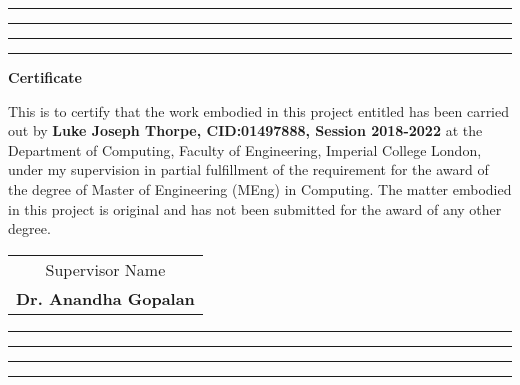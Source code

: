 \thispagestyle{empty}
\hrule\hrule\hrule\hrule %
\vspace{1 in}

\begin{center}

    \textbf{\large Certificate}
    \\
\end{center}
This is to certify that the work embodied in this project entitled \textbf{} has been carried out by \textbf{Luke Joseph Thorpe, CID:01497888, Session 2018-2022} at the Department of Computing, Faculty of Engineering, Imperial College London, under my supervision in partial fulfillment of the requirement for the award of the degree of Master of Engineering (MEng) in Computing.
The matter embodied in this project is original and has not been submitted for the award of any other degree.
\\
\begin{table}[!h]
    \centering
    \begin{tabular} {c}
        Supervisor Name \\
        \bf Dr. Anandha Gopalan

    \end{tabular}
\end{table}
\vfill
\hrule\hrule\hrule\hrule
